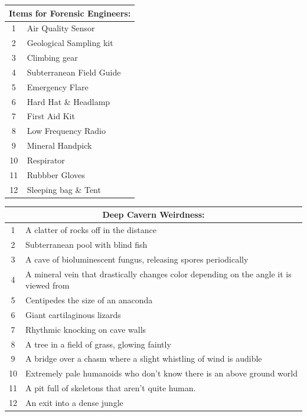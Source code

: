 \documentclass[a4,landscape]{book}
\begin{document}
\begin{multicols*}{4}
\begin{center}
  \begin{tabular}{|c|l|}
    \hline \multicolumn{2}{|c|}{Items for Forensic Engineers:} \\
    \hline 1 & Air Quality Sensor \\
    2 & Geological Sampling kit \\
    3 & Climbing gear \\
    4 & Subterranean Field Guide \\
    5 & Emergency Flare \\
    6 & Hard Hat \& Headlamp \\
    7 & First Aid Kit \\
    8 & Low Frequency Radio \\
    9 & Mineral Handpick \\
    10 & Respirator \\
    11 & Rubbber Gloves \\
    12 & Sleeping bag \& Tent \\ \hline
  \end{tabular}
\end{center}
\vfill
\columnbreak
\begin{center}
  \begin{tabular}{|c|p{}|}
    \hline \multicolumn{2}{|c|}{Deep Cavern Weirdness:} \\
    \hline 1 & A clatter of rocks off in the distance                                            \\
    2 & Subterranean pool with blind fish                                                        \\
    3 & A cave of bioluminescent fungus, releasing spores periodically                           \\
    4 & A mineral vein that drastically changes color depending on the angle it is viewed from   \\
    5 & Centipedes the size of an anaconda                                                       \\
    6 & Giant cartilaginous lizards                                                              \\
    7 & Rhythmic knocking on cave walls                                                          \\
    8 & A tree in a field of grass, glowing faintly                                              \\
    9 & A bridge over a chasm where a slight whistling of wind is audible                        \\
    10 & Extremely pale humanoids who don't know there is an above ground world                  \\
    11 & A pit full of skeletons that aren't quite human.                                        \\
    12 & An exit into a dense jungle                                                             \\ \hline
  \end{tabular}
\end{center}


\end{multicols*}
\end{document}

